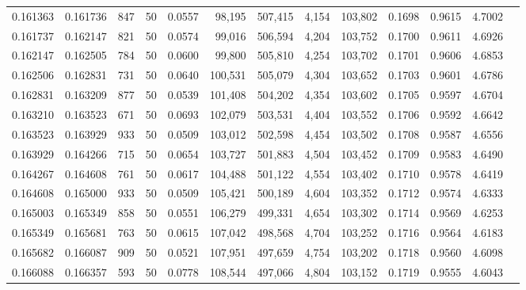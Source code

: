 \begin{tabular}{rrrrrrrrrrrrr}
0.161363 & 0.161736 &   847 &  50 &                                     0.0557 &  98,195 & 507,415 &   4,154 & 103,802 & 0.1698 & 0.9615 & 4.7002 \\
0.161737 & 0.162147 &   821 &  50 &                                     0.0574 &  99,016 & 506,594 &   4,204 & 103,752 & 0.1700 & 0.9611 & 4.6926 \\
0.162147 & 0.162505 &   784 &  50 &                                     0.0600 &  99,800 & 505,810 &   4,254 & 103,702 & 0.1701 & 0.9606 & 4.6853 \\
0.162506 & 0.162831 &   731 &  50 &                                     0.0640 & 100,531 & 505,079 &   4,304 & 103,652 & 0.1703 & 0.9601 & 4.6786 \\
0.162831 & 0.163209 &   877 &  50 &                                     0.0539 & 101,408 & 504,202 &   4,354 & 103,602 & 0.1705 & 0.9597 & 4.6704 \\
0.163210 & 0.163523 &   671 &  50 &                                     0.0693 & 102,079 & 503,531 &   4,404 & 103,552 & 0.1706 & 0.9592 & 4.6642 \\
0.163523 & 0.163929 &   933 &  50 &                                     0.0509 & 103,012 & 502,598 &   4,454 & 103,502 & 0.1708 & 0.9587 & 4.6556 \\
0.163929 & 0.164266 &   715 &  50 &                                     0.0654 & 103,727 & 501,883 &   4,504 & 103,452 & 0.1709 & 0.9583 & 4.6490 \\
0.164267 & 0.164608 &   761 &  50 &                                     0.0617 & 104,488 & 501,122 &   4,554 & 103,402 & 0.1710 & 0.9578 & 4.6419 \\
0.164608 & 0.165000 &   933 &  50 &                                     0.0509 & 105,421 & 500,189 &   4,604 & 103,352 & 0.1712 & 0.9574 & 4.6333 \\
0.165003 & 0.165349 &   858 &  50 &                                     0.0551 & 106,279 & 499,331 &   4,654 & 103,302 & 0.1714 & 0.9569 & 4.6253 \\
0.165349 & 0.165681 &   763 &  50 &                                     0.0615 & 107,042 & 498,568 &   4,704 & 103,252 & 0.1716 & 0.9564 & 4.6183 \\
0.165682 & 0.166087 &   909 &  50 &                                     0.0521 & 107,951 & 497,659 &   4,754 & 103,202 & 0.1718 & 0.9560 & 4.6098 \\
0.166088 & 0.166357 &   593 &  50 &                                     0.0778 & 108,544 & 497,066 &   4,804 & 103,152 & 0.1719 & 0.9555 & 4.6043 \\

\end{tabular}

